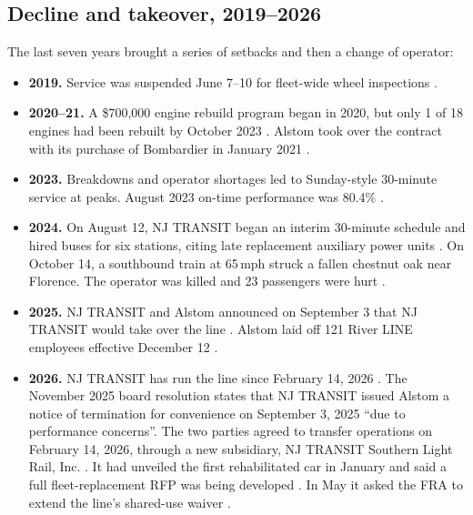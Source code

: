 \documentclass[11pt]{article}
\begin{document}
\subsection{Decline and takeover, 2019--2026}
The last seven years brought a series of setbacks and then a change of operator:
\begin{itemize}
\item \textbf{2019.} Service was suspended June 7--10 for fleet-wide wheel inspections \citep{cbs2019wheels}.
\item \textbf{2020--21.} A \$700{,}000 engine rebuild program began in 2020, but only 1 of 18 engines had been rebuilt by October 2023 \citep{singleton2025}. Alstom took over the contract with its purchase of Bombardier in January 2021 \citep{alstom2021}.
\item \textbf{2023.} Breakdowns and operator shortages led to Sunday-style 30-minute service at peaks. August 2023 on-time performance was 80.4\% \citep{inquirer2023}.
\item \textbf{2024.} On August 12, NJ TRANSIT began an interim 30-minute schedule and hired buses for six stations, citing late replacement auxiliary power units \citep{njt2024interim}. On October 14, a southbound train at 65\,mph struck a fallen chestnut oak near Florence. The operator was killed and 23 passengers were hurt \citep{ntsb2025}.
\item \textbf{2025.} NJ TRANSIT and Alstom announced on September 3 that NJ TRANSIT would take over the line \citep{njt2025alstom}. Alstom laid off 121 River LINE employees effective December 12 \citep{patch2025layoffs}.
\item \textbf{2026.} NJ TRANSIT has run the line since February 14, 2026 \citep{ols2027njt}. The November 2025 board resolution states that NJ TRANSIT issued Alstom a notice of termination for convenience on September 3, 2025 ``due to performance concerns''. The two parties agreed to transfer operations on February 14, 2026, through a new subsidiary, NJ TRANSIT Southern Light Rail, Inc. \citep{njt2025board}. It had unveiled the first rehabilitated car in January and said a full fleet-replacement RFP was being developed \citep{njt2026rehab}. In May it asked the FRA to extend the line's shared-use waiver \citep{fr2026waiver}.
\end{itemize}
\end{document}
